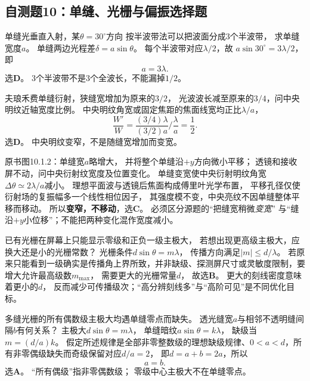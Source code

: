 
\subsection{自测题10：单缝、光栅与偏振选择题}

\problemtext 单缝光垂直入射，某$\theta=30^\circ$方向
按半波带法可以把波面分成3个半波带，
求单缝宽度$a$。
\workings
单缝两边光程差$\delta=a\sin\theta$。
每个半波带对应$\lambda/2$，故
$a\sin30^\circ=3\lambda/2$，即
\[
\boxed{a=3\lambda}.
\]
选\textbf{D}。
\crosscheck 3个半波带不是3个全波长，不能漏掉$1/2$。

\problemtext 夫琅禾费单缝衍射，狭缝宽增加为原来的$3/2$，
光波波长减至原来的$3/4$，问中央明纹近轴宽度比例。
\workings
中央明纹角宽或固定焦距的焦面线宽均正比$\lambda/a$，
\[
\boxed{\frac{W'}W=
\frac{(3/4)\lambda}{(3/2)a}\bigg/
\frac{\lambda}{a}=\frac12}.
\]
选\textbf{D}。
\crosscheck 中央明纹变窄，不是随缝宽增加而变宽。

\problemtext 原书图10.1.2：单缝宽$a$略增大，
并将整个单缝沿$+y$方向微小平移；
透镜和接收屏不动，问中央衍射纹宽度及位置变化。
\workings
单缝变宽使中央衍射明纹角宽
$\Delta\theta\simeq2\lambda/a$减小。
理想平面波与透镜后焦面构成傅里叶光学布置，
平移孔径仅使衍射场的复振幅多一个线性相位因子，
其强度模不变，中央亮纹不因单缝整体平移而移动。
所以\textbf{变窄，不移动}，选\textbf{C}。
\crosscheck 必须区分源题的“把缝宽稍微\emph{变宽}”
与“缝沿$+y$小位移”；不能把两种变化混作宽度减小。

\problemtext 已有光栅在屏幕上只能显示零级和正负一级主极大，
若想出现更高级主极大，应换大还是小的光栅常数？
\workings
光栅条件$d\sin\theta=m\lambda$，
传播方向满足$|m|\le d/\lambda$。
若原来只能看到一级确实是传播角上界所致，并非缺级、探测屏尺寸或灵敏度限制，要增大允许最高级数$m_{\max}$，
需要更大的光栅常量$d$，
故选\textbf{B}。
\crosscheck 更大的刻线密度意味着更小的$d$，
反而减少可传播级次；“高分辨刻线多”与“高阶可见”是不同优化目标。

\problemtext 多缝光栅的所有偶数级主极大均遇单缝零点而缺失。
透光缝宽$a$与相邻不透明缝间隔$b$有何关系？
\workings
主极大$d\sin\theta=m\lambda$，
单缝暗纹$a\sin\theta=k\lambda$，
缺级当$m=(d/a)k$。
假定所述规律是全部非零整数级的理想缺级规律、$0<a<d$，所有非零偶级缺失而奇级保留对应$d/a=2$，
即$d=a+b=2a$，所以
\[
\boxed{a=b}.
\]
选\textbf{A}。
\crosscheck “所有偶级”指非零偶数级；
零级中心主极大不在单缝零点。

